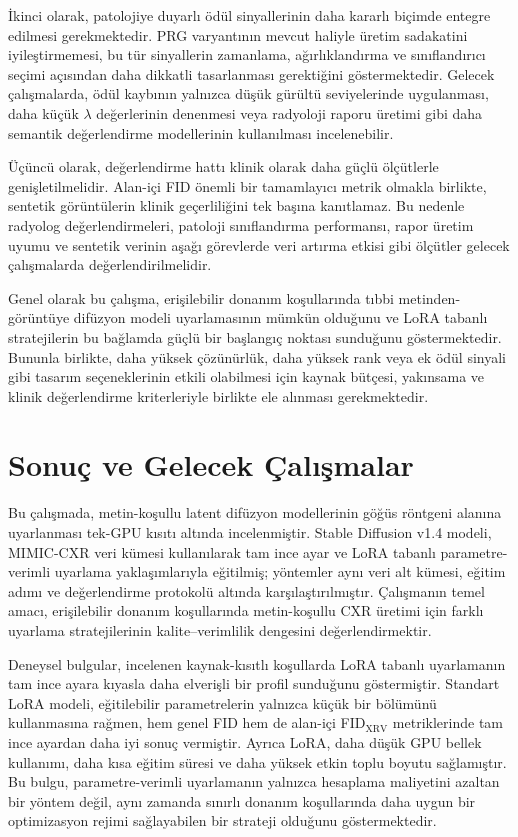 \documentclass[11pt]{article}
\begin{document}
İkinci olarak, patolojiye duyarlı ödül sinyallerinin daha kararlı biçimde
entegre edilmesi gerekmektedir. PRG varyantının mevcut haliyle üretim sadakatini
iyileştirmemesi, bu tür sinyallerin zamanlama, ağırlıklandırma ve sınıflandırıcı
seçimi açısından daha dikkatli tasarlanması gerektiğini göstermektedir. Gelecek
çalışmalarda, ödül kaybının yalnızca düşük gürültü seviyelerinde uygulanması,
daha küçük $\lambda$ değerlerinin denenmesi veya radyoloji raporu üretimi gibi
daha semantik değerlendirme modellerinin kullanılması incelenebilir.

Üçüncü olarak, değerlendirme hattı klinik olarak daha güçlü ölçütlerle
genişletilmelidir. Alan-içi FID önemli bir tamamlayıcı metrik olmakla birlikte,
sentetik görüntülerin klinik geçerliliğini tek başına kanıtlamaz. Bu nedenle
radyolog değerlendirmeleri, patoloji sınıflandırma performansı, rapor üretim
uyumu ve sentetik verinin aşağı görevlerde veri artırma etkisi gibi ölçütler
gelecek çalışmalarda değerlendirilmelidir.

Genel olarak bu çalışma, erişilebilir donanım koşullarında tıbbi
metinden-görüntüye difüzyon modeli uyarlamasının mümkün olduğunu ve LoRA
tabanlı stratejilerin bu bağlamda güçlü bir başlangıç noktası sunduğunu
göstermektedir. Bununla birlikte, daha yüksek çözünürlük, daha yüksek rank veya
ek ödül sinyali gibi tasarım seçeneklerinin etkili olabilmesi için kaynak
bütçesi, yakınsama ve klinik değerlendirme kriterleriyle birlikte ele alınması
gerekmektedir.


\section{Sonuç ve Gelecek Çalışmalar}
\label{sec:conclusion}

Bu çalışmada, metin-koşullu latent difüzyon modellerinin göğüs röntgeni alanına
uyarlanması tek-GPU kısıtı altında incelenmiştir. Stable Diffusion v1.4 modeli,
MIMIC-CXR veri kümesi kullanılarak tam ince ayar ve LoRA tabanlı
parametre-verimli uyarlama yaklaşımlarıyla eğitilmiş; yöntemler aynı veri alt
kümesi, eğitim adımı ve değerlendirme protokolü altında karşılaştırılmıştır.
Çalışmanın temel amacı, erişilebilir donanım koşullarında metin-koşullu CXR
üretimi için farklı uyarlama stratejilerinin kalite--verimlilik dengesini
değerlendirmektir.

Deneysel bulgular, incelenen kaynak-kısıtlı koşullarda LoRA tabanlı uyarlamanın
tam ince ayara kıyasla daha elverişli bir profil sunduğunu göstermiştir.
Standart LoRA modeli, eğitilebilir parametrelerin yalnızca küçük bir bölümünü
kullanmasına rağmen, hem genel FID hem de alan-içi FID$_{\text{XRV}}$
metriklerinde tam ince ayardan daha iyi sonuç vermiştir. Ayrıca LoRA, daha düşük
GPU bellek kullanımı, daha kısa eğitim süresi ve daha yüksek etkin toplu boyutu
sağlamıştır. Bu bulgu, parametre-verimli uyarlamanın yalnızca hesaplama
maliyetini azaltan bir yöntem değil, aynı zamanda sınırlı donanım koşullarında
daha uygun bir optimizasyon rejimi sağlayabilen bir strateji olduğunu
göstermektedir.
\end{document}
